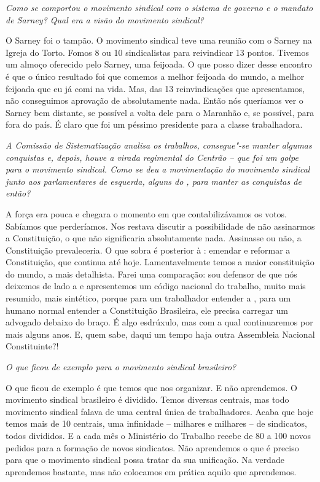 \medskip

\noindent\emph{Como se comportou o movimento sindical com o sistema de governo
e o mandato de Sarney? Qual era a visão do movimento sindical?}

O Sarney foi o tampão. O movimento sindical teve
uma reunião com o Sarney na Igreja do Torto. Fomos 8 ou 10 sindicalistas
para reivindicar 13 pontos. Tivemos um almoço oferecido pelo Sarney, uma
feijoada. O que posso dizer desse encontro é que o único resultado foi
que comemos a melhor feijoada do mundo, a melhor feijoada que eu já comi
na vida. Mas, das 13 reinvindicações que apresentamos, não conseguimos
aprovação de absolutamente nada. Então nós queríamos ver o Sarney bem
distante, se possível a volta dele para o Maranhão e, se possível, para
fora do país. É claro que foi um péssimo presidente para a classe
trabalhadora.

\medskip

\noindent\emph{A Comissão de Sistematização analisa os trabalhos, consegue"-se
manter algumas conquistas e, depois, houve a virada regimental do
Centrão -- que foi um golpe para o movimento sindical. Como se deu a
movimentação do movimento sindical junto aos parlamentares de esquerda,
alguns do , para manter as conquistas de então?}

A força era pouca e chegara o momento em que
contabilizávamos os votos. Sabíamos que perderíamos. Nos restava
discutir a possibilidade de não assinarmos a Constituição, o que não
significaria absolutamente nada. Assinasse ou não, a Constituição
prevaleceria. O que sobra é posterior à : emendar e reformar a
Constituição, que continua até hoje. Lamentavelmente temos a maior
constituição do mundo, a mais detalhista. Farei uma comparação: sou
defensor de que nós deixemos de lado a  e apresentemos um código
nacional do trabalho, muito mais resumido, mais sintético, porque para
um trabalhador entender a , para um humano normal entender a
Constituição Brasileira, ele precisa carregar um advogado debaixo do
braço. É algo esdrúxulo, mas com a qual continuaremos por mais alguns
anos. E, quem sabe, daqui um tempo haja outra Assembleia Nacional
Constituinte?!

\pagebreak

\noindent\emph{O que ficou de exemplo para o movimento sindical brasileiro?}

O que ficou de exemplo é que temos que nos
organizar. E não aprendemos. O movimento sindical brasileiro é dividido.
Temos diversas centrais, mas todo movimento sindical falava de uma
central única de trabalhadores. Acaba que hoje temos mais de 10
centrais, uma infinidade -- milhares e milhares -- de sindicatos, todos
divididos. E a cada mês o Ministério do Trabalho recebe de 80 a 100
novos pedidos para a formação de novos sindicatos. Não aprendemos o que
é preciso para que o movimento sindical possa tratar da sua unificação.
Na verdade aprendemos bastante, mas não colocamos em prática aquilo que
aprendemos.

